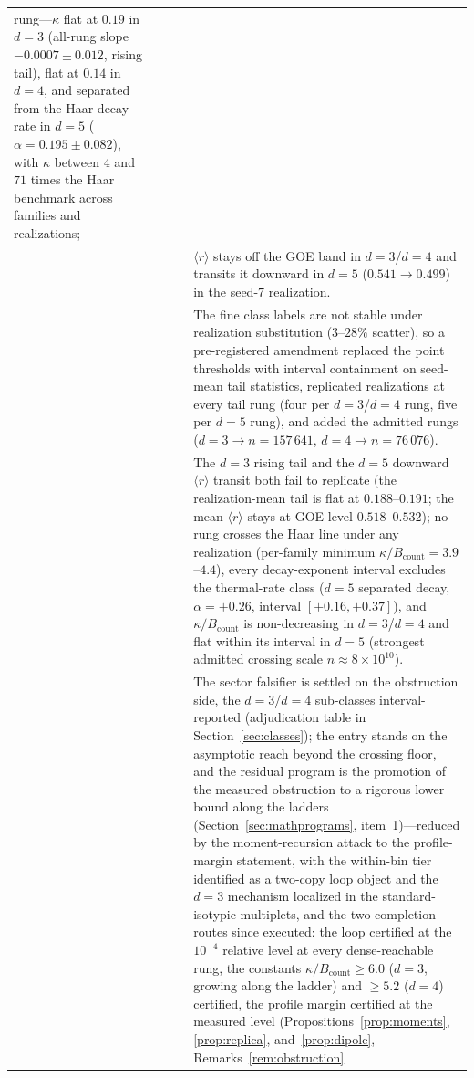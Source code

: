 \begin{longtable}{@{}p{}p{}p{}p{}p{}@{}}
rung---$\kappa$ flat at $0.19$ in $d=3$ (all-rung slope
$-0.0007\pm0.012$, rising tail), flat at $0.14$ in $d=4$, and separated
from the Haar decay rate in $d=5$ ($\alpha=0.195\pm0.082$), with $\kappa$
between $4$ and $71$ times the Haar benchmark across families and
realizations;\\
 & & & & $\langle r\rangle$ stays off the GOE band in $d=3$/$d=4$
and transits it downward in $d=5$ ($0.541\to0.499$) in the seed-$7$
realization.\\
 & & & & The fine class labels are not stable under realization
substitution ($3$--$28\%$ scatter), so a pre-registered amendment
replaced the point thresholds with interval containment on seed-mean
tail statistics, replicated realizations at every tail rung (four per
$d=3$/$d=4$ rung, five per $d=5$ rung), and added the admitted rungs
($d=3\to n=157\,641$, $d=4\to n=76\,076$).\\
 & & & & The $d=3$ rising tail and
the $d=5$ downward $\langle r\rangle$ transit both fail to replicate
(the realization-mean tail is flat at $0.188$--$0.191$; the mean
$\langle r\rangle$ stays at GOE level $0.518$--$0.532$); no rung
crosses the Haar line under any realization (per-family minimum
$\kappa/B_{\mathrm{count}}=3.9$--$4.4$), every decay-exponent interval
excludes the thermal-rate class ($d=5$ separated decay, $\alpha=+0.26$,
interval $[+0.16,+0.37]$), and $\kappa/B_{\mathrm{count}}$ is
non-decreasing in $d=3$/$d=4$ and flat within its interval in $d=5$
(strongest admitted crossing scale $n\approx8\times10^{10}$).\\
 & & & & The
sector falsifier is settled on the obstruction side, the $d=3$/$d=4$
sub-classes interval-reported (adjudication table in Section~\ref{sec:classes}); the
entry stands on the asymptotic reach beyond the crossing floor, and the residual
program is the promotion of the measured obstruction to a rigorous lower bound along
the ladders (Section~\ref{sec:mathprograms}, item~1)---reduced by the
moment-recursion attack to the profile-margin statement, with the within-bin tier
identified as a two-copy loop object and the $d=3$ mechanism localized in the
standard-isotypic multiplets, and the two completion routes since executed: the loop
certified at the $10^{-4}$ relative level at every dense-reachable rung, the constants
$\kappa/B_{\mathrm{count}}\ge6.0$ ($d=3$, growing along the ladder) and $\ge5.2$
($d=4$) certified, the profile margin certified at the measured level
(Propositions~\ref{prop:moments}, \ref{prop:replica}, and~\ref{prop:dipole},
Remarks~\ref{rem:obstruction}

\end{longtable}
